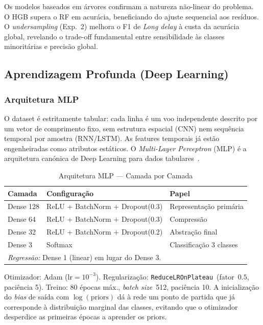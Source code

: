 \documentclass[conference]{IEEEtran}
\begin{document}
Os modelos baseados em árvores confirmam a natureza não-linear do problema. O HGB
supera o RF em acurácia, beneficiando do ajuste sequencial aos resíduos. O
\textit{undersampling} (Exp.~2) melhora o F1 de \textit{Long delay} à custa da
acurácia global, revelando o trade-off fundamental entre sensibilidade às classes
minoritárias e precisão global.

\subsection{Aprendizagem Profunda (Deep Learning)}

\subsubsection{Arquitetura MLP}

O dataset é estritamente tabular: cada linha é um voo independente descrito por um
vetor de comprimento fixo, sem estrutura espacial (CNN) nem sequência temporal por
amostra (RNN/LSTM). As features temporais já estão engenheiradas como atributos
estáticos. O \textit{Multi-Layer Perceptron} (MLP) é a arquitetura canónica de Deep
Learning para dados tabulares~\cite{tensorflow}.

\begin{table}[h]
\centering
\caption{Arquitetura MLP — Camada por Camada}
\label{tab:mlp_arch}
\begin{tabular}{lll}
\toprule
\textbf{Camada} & \textbf{Configuração} & \textbf{Papel} \\
\midrule
Dense 128 & ReLU + BatchNorm + Dropout(0.3) & Representação primária \\
Dense 64  & ReLU + BatchNorm + Dropout(0.3) & Compressão \\
Dense 32  & ReLU + BatchNorm + Dropout(0.2) & Abstração final \\
Dense 3   & Softmax                          & Classificação 3 classes \\
\midrule
\multicolumn{3}{l}{\textit{Regressão:} Dense 1 (linear) em lugar do Dense 3.} \\
\bottomrule
\end{tabular}
\end{table}

Otimizador: Adam ($\text{lr}=10^{-3}$). Regularização:
\texttt{ReduceLROnPlateau}~(fator~$0.5$, paciência 5). Treino: 80 épocas máx.,
\textit{batch size}~512, paciência 10. A inicialização do \textit{bias} de saída
com $\log(\text{priors})$ dá à rede um ponto de partida que já corresponde à
distribuição marginal das classes, evitando que o otimizador desperdice as primeiras
épocas a aprender os priors.
\end{document}
